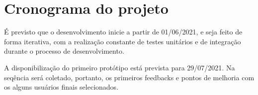 \chapter{Cronograma do projeto}
\label{c.cronograma}



É previsto que o desenvolvimento inicie a partir de 01/06/2021, e seja feito de forma iterativa, com a realização constante de testes unitários e de integração durante o processo de desenvolvimento.

A disponibilização do primeiro protótipo está prevista para 29/07/2021. Na seqência será coletado, portanto, os primeiros feedbacks e pontos de melhoria com os alguns usuários finais selecionados.


